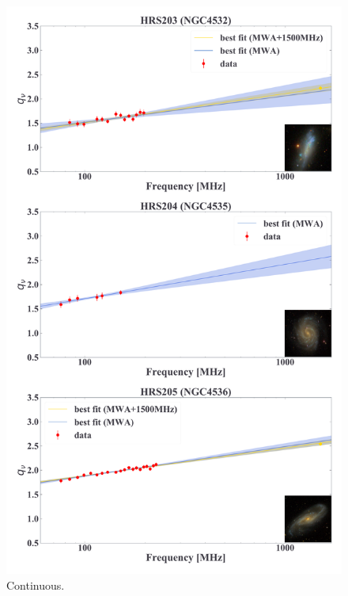 \documentclass[12pt,a4paper,twoside,openright,final,titlepage]{report}
\begin{document}
\begin{appendices}
\begin{figure}[htbp]
    \centering
    \includegraphics[width=.8\linewidth]{Figures/AppendixC_qfitting5.pdf}
    \caption[Fitting results for 18 samples (5)]{\label{fig:fittingresults5}
        Continuous.
    }
\end{figure}


\end{appendices}
\end{document}
